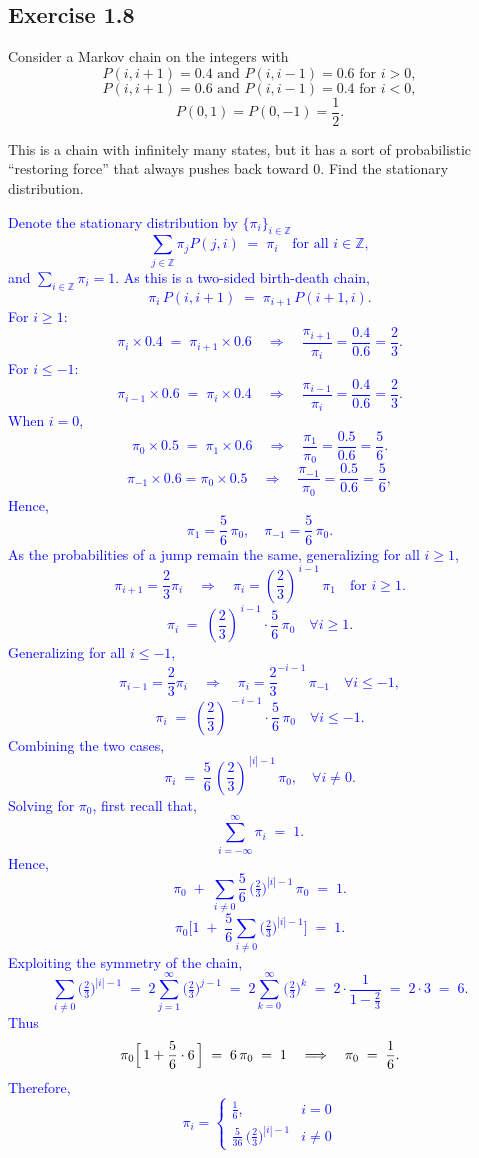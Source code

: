 \documentclass{article}
\begin{document}
    \subsection*{Exercise 1.8} Consider a Markov chain on the integers with
\[
P(i, i+1) = 0.4 \text{ and } P(i, i-1) = 0.6 \text{ for } i > 0,
\]
\[
P(i, i+1) = 0.6 \text{ and } P(i, i-1) = 0.4 \text{ for } i < 0,
\]
\[
P(0,1) = P(0,-1) = \frac{1}{2}.
\]

This is a chain with infinitely many states, but it has a sort of probabilistic ``restoring force'' that always pushes back toward 0. Find the stationary distribution.

\textcolor{blue}{
Denote the stationary distribution by $\{\pi_i\}_{i\in\mathbb{Z}}$
\[
\sum_{j \in \mathbb{Z}} \pi_j P(j,i) \;=\; \pi_i
\quad \text{for all } i \in \mathbb{Z},
\]
and $\sum_{i \in \mathbb{Z}} \pi_i = 1$.
As this is a two-sided birth-death chain,
\[
\pi_i \, P(i, i+1) \;=\; \pi_{i+1} \, P(i+1, i).
\]
For $i \ge 1$:
\[
\pi_i \times 0.4 \;=\; \pi_{i+1} \times 0.6
\quad \Longrightarrow \quad 
\frac{\pi_{i+1}}{\pi_i} = \frac{0.4}{0.6} = \frac{2}{3}.
\]
For $i \le -1$:
\[
    \pi_{i-1} \times 0.6 \;=\; \pi_{i} \times 0.4
\quad \Longrightarrow \quad 
\frac{\pi_{i-1}}{\pi_i} = \frac{0.4}{0.6} = \frac{2}{3}.
\]
When $i=0$,
\[
\pi_0 \times 0.5 \;=\; \pi_1 \times 0.6
\quad \Longrightarrow \quad
\frac{\pi_1}{\pi_0} = \frac{0.5}{0.6} = \frac{5}{6}.
\]
\[
\pi_{-1} \times 0.6 = \pi_0 \times 0.5
\quad \Longrightarrow \quad 
\frac{\pi_{-1}}{\pi_{0}} = \frac{0.5}{0.6} = \frac{5}{6},
\]
Hence,
\[
\pi_1 = \frac{5}{6}\,\pi_0, 
\quad
\pi_{-1} = \frac{5}{6}\,\pi_0.
\]
As the probabilities of a jump remain the same, generalizing for all $i\geq1$,
\[
\pi_{i+1} = \frac{2}{3} \pi_{i}
\quad\Longrightarrow\quad 
\pi_i = \left(\frac{2}{3}\right)^{\,i-1} \,\pi_1
\quad \text{for } i \ge 1.
\]
\[
\pi_i 
\;=\; 
\left(\frac{2}{3}\right)^{\,i-1} \cdot \frac{5}{6}\,\pi_0
\quad \forall i \ge 1.
\]
Generalizing for all $i\leq-1$,
\[
    \pi_{i-1} = \frac{2}{3} \pi_{i}
\quad\Longrightarrow\quad
\pi_{i} = \frac{2}{3}^{-i-1}\,\pi_{-1}
\quad \forall i\leq -1,
\]
\[
    \pi_{i} 
\;=\; 
\left(\frac{2}{3}\right)^{\,-i-1} \cdot \frac{5}{6}\,\pi_0
\quad \forall i \leq -1.
\]
Combining the two cases,
\[
\pi_i 
\;=\;
\frac{5}{6}\,\left(\frac{2}{3}\right)^{\,|i|-1}\,\pi_0, \quad \forall i \neq 0.
\]
Solving for $\pi_0$, first recall that,
\[
\sum_{i=-\infty}^{\infty} \pi_i \;=\; 1.
\]
Hence,
\[
\pi_0 
\;+\;
\sum_{i\neq 0} \frac{5}{6} \,\biggl(\tfrac{2}{3}\biggr)^{|i|-1}\,\pi_0
\;=\; 1.
\]
\[
\pi_0 
\biggl[
1 
\;+\; 
\frac{5}{6}\sum_{i\neq 0}\bigl(\tfrac{2}{3}\bigr)^{|i|-1}
\biggr]
\;=\; 1.
\]
Exploiting the symmetry of the chain,
\[
\sum_{i\neq 0}\bigl(\tfrac{2}{3}\bigr)^{|i|-1} 
\;=\;
2 \sum_{j=1}^{\infty} \bigl(\tfrac{2}{3}\bigr)^{j-1}
\;=\;
2 \sum_{k=0}^{\infty} \bigl(\tfrac{2}{3}\bigr)^{k}
\;=\;
2 \cdot \frac{1}{1 - \tfrac{2}{3}}
\;=\;
2 \cdot 3
\;=\;
6.
\]
Thus
\[
\pi_0 \Bigl[\,1 + \frac56 \cdot 6\,\Bigr] 
\;=\;
6\,\pi_0
\;=\;
1 
\quad\Longrightarrow\quad
\pi_0 
\;=\; 
\frac{1}{6}.
\]
Therefore,
\[
\pi_i
=
\begin{cases}
\displaystyle \frac{1}{6},
& i=0\\[6pt]
\displaystyle \frac{5}{36}\,\bigl(\tfrac{2}{3}\bigr)^{|i|-1}
& i \neq 0
\end{cases}
\]
}
\end{document}
